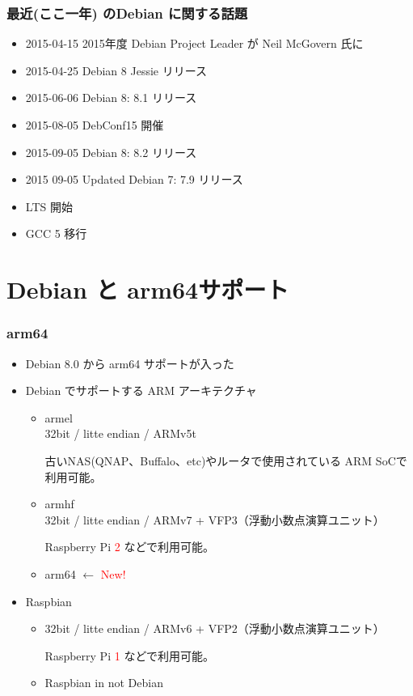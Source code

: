 \documentclass[cjk,dvipdfmx,10pt,compress,%
hyperref={bookmarks=true,bookmarksnumbered=true,bookmarksopen=false,%
colorlinks=false,%
pdftitle={第 103 回 関西 Debian 勉強会},%
pdfauthor={岩松 信洋},%
pdfsubject={資料},%
}]{beamer}
\begin{document}
\begin{frame}[fragile]
  \frametitle{最近(ここ一年) のDebian に関する話題}

  \begin{itemize}
\item 2015-04-15 2015年度 Debian  Project Leader が Neil McGovern 氏に
\item 2015-04-25 Debian 8 Jessie リリース
\item 2015-06-06 Debian 8: 8.1 リリース
\item 2015-08-05 DebConf15 開催
\item 2015-09-05 Debian 8: 8.2 リリース
\item 2015 09-05 Updated Debian 7: 7.9 リリース
\item LTS 開始
\item GCC 5 移行
  \end{itemize}

\end{frame}




\section{Debian と arm64サポート}

\begin{frame}[fragile]
  \frametitle{arm64}
  \begin{itemize}
  \item Debian 8.0 から arm64 サポートが入った
  \item Debian でサポートする ARM アーキテクチャ
　\begin{itemize}
  \item armel\\
  32bit / litte endian / ARMv5t

  古いNAS(QNAP、Buffalo、etc)やルータで使用されている ARM SoCで利用可能。

  \item armhf\\
  32bit / litte endian / ARMv7 + VFP3（浮動小数点演算ユニット）

  Raspberry Pi \textcolor{red}{2} などで利用可能。

  \item arm64 $\leftarrow$ \textcolor{red}{New!}

  \end{itemize}

  \item Raspbian

  \begin{itemize}
  \item 32bit / litte endian / ARMv6 + VFP2（浮動小数点演算ユニット）

       Raspberry Pi \textcolor{red}{1} などで利用可能。
  \item Raspbian in not Debian

  \end{itemize}

  \end{itemize}

\end{frame}
\end{document}
